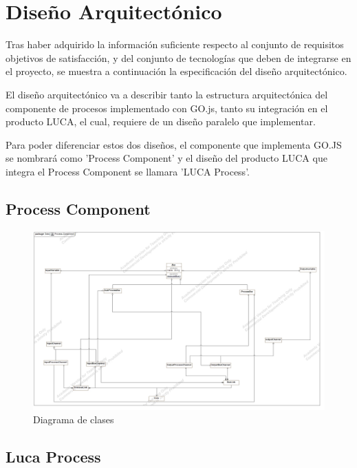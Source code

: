 \documentclass[a4paper,12pt]{book}
\begin{document}
	
	\afterpage{\null\newpage}
	\newpage
	
	\chapter{Diseño Arquitectónico}
	
	Tras haber adquirido la información suficiente respecto al conjunto de requisitos objetivos de satisfacción, y del conjunto de tecnologías que deben de integrarse en el proyecto, se muestra a continuación la especificación del diseño arquitectónico.
	
	\vspace{5mm}
	
	El diseño arquitectónico va a describir tanto la estructura arquitectónica del componente de procesos implementado con GO.js, tanto su integración en el producto LUCA, el cual, requiere de un diseño paralelo que implementar.
	
	
	\minitoc
	
	
	Para poder diferenciar estos dos diseños, el componente que implementa GO.JS se nombrará como 'Process Component' y el diseño del producto LUCA que integra el Process Component se llamara 'LUCA Process'.
	
		\section{Process Component}
		
		
		\begin{figure}[H]
			\centering
			\includegraphics[scale=0.25]{Process-Component.jpg}
			\caption{Diagrama de clases}\label{fig:Process-Component}
		\end{figure}
		
		
		\section{Luca Process}
		
\end{document}
